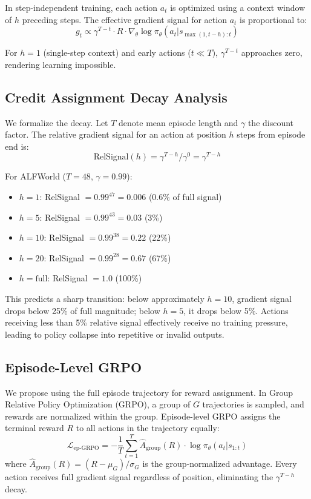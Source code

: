 \documentclass[11pt]{article}
\begin{document}
In step-independent training, each action $a_t$ is optimized using a context window of $h$ preceding steps. The effective gradient signal for action $a_t$ is proportional to:
\begin{equation}
g_t \propto \gamma^{T - t} \cdot R \cdot \nabla_\theta \log \pi_\theta(a_t | s_{\max(1, t-h):t})
\end{equation}

For $h=1$ (single-step context) and early actions ($t \ll T$), $\gamma^{T-t}$ approaches zero, rendering learning impossible.

\subsection{Credit Assignment Decay Analysis}

We formalize the decay. Let $T$ denote mean episode length and $\gamma$ the discount factor. The relative gradient signal for an action at position $h$ steps from episode end is:
\begin{equation}
\text{RelSignal}(h) = \gamma^{T-h} / \gamma^0 = \gamma^{T-h}
\end{equation}

For ALFWorld ($T=48$, $\gamma=0.99$):
\begin{itemize}
\item $h=1$: RelSignal $= 0.99^{47} = 0.006$ (0.6\% of full signal)
\item $h=5$: RelSignal $= 0.99^{43} = 0.03$ (3\%)
\item $h=10$: RelSignal $= 0.99^{38} = 0.22$ (22\%)
\item $h=20$: RelSignal $= 0.99^{28} = 0.67$ (67\%)
\item $h=\text{full}$: RelSignal $= 1.0$ (100\%)
\end{itemize}

This predicts a sharp transition: below approximately $h=10$, gradient signal drops below 25\% of full magnitude; below $h=5$, it drops below 5\%. Actions receiving less than 5\% relative signal effectively receive no training pressure, leading to policy collapse into repetitive or invalid outputs.

\subsection{Episode-Level GRPO}

We propose using the full episode trajectory for reward assignment. In Group Relative Policy Optimization (GRPO), a group of $G$ trajectories is sampled, and rewards are normalized within the group. Episode-level GRPO assigns the terminal reward $R$ to all actions in the trajectory equally:
\begin{equation}
\mathcal{L}_{\text{ep-GRPO}} = -\frac{1}{T} \sum_{t=1}^{T} \hat{A}_{\text{group}}(R) \cdot \log \pi_\theta(a_t | s_{1:t})
\end{equation}
where $\hat{A}_{\text{group}}(R) = (R - \mu_G) / \sigma_G$ is the group-normalized advantage. Every action receives full gradient signal regardless of position, eliminating the $\gamma^{T-h}$ decay.
\end{document}
